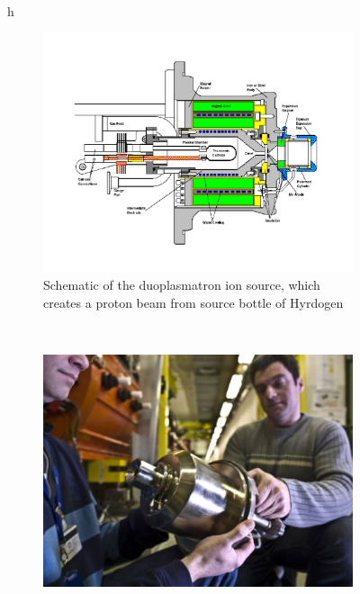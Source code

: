 \begin{figure}{h}
    \centering
    \begin{subfigure}[h]{0.4\textwidth}
        \includegraphics[width=\textwidth]{Figures/LHC_Diagrams/LHC__Linac2__Duoplasmatron_Schematic.pdf}
        \caption{Schematic of the duoplasmatron ion source, which
          creates a proton beam from source bottle of Hyrdogen}\label{fig:duoplasmatron_schematic}
      \end{subfigure}
      ~ %
      \begin{subfigure}[h]{0.4\textwidth}
        \includegraphics[width=\textwidth]{Figures/LHC_Diagrams/LHC__Linac2__Duoplasmatron__CF002521-ProtonSourceDuoplasmatronRichardChristianss.jpg}

\end{subfigure}
\end{figure}
